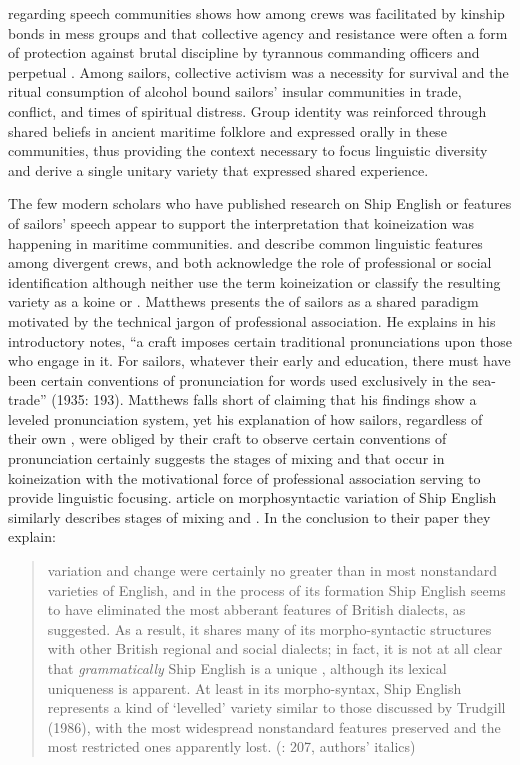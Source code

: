 regarding speech communities shows how  among crews was facilitated by kinship bonds in mess groups and that collective agency and resistance were often a form of protection against brutal discipline by tyrannous commanding officers and perpetual . Among sailors, collective activism was a necessity for survival and the ritual consumption of alcohol bound sailors’ insular communities in trade, conflict, and times of spiritual distress. Group identity was reinforced through shared beliefs in ancient maritime folklore and expressed orally in these communities, thus providing the context necessary to focus linguistic diversity and derive a single unitary variety that expressed shared experience. 


The few modern scholars who have published research on Ship English or features of sailors’ speech appear to support the interpretation that koineization was happening in maritime communities. \citet{Matthews1935} and \citet{BaileyRoss1988} describe common linguistic features among divergent crews, and both acknowledge the role of professional or social identification although neither use the term koineization or classify the resulting variety as a koine or . Matthews presents the  of sailors as a shared paradigm motivated by the technical jargon of professional association. He explains in his introductory notes, “a craft imposes certain traditional pronunciations upon those who engage in it. For sailors, whatever their early  and education, there must have been certain conventions of pronunciation for words used exclusively in the sea-trade” (1935: 193). Matthews falls short of claiming that his findings show a leveled pronunciation system, yet his explanation of how sailors, regardless of their own , were obliged by their craft to observe certain conventions of pronunciation certainly suggests the stages of mixing and  that occur in koineization with the motivational force of professional association serving to provide linguistic focusing.  article on morphosyntactic variation of Ship English similarly describes stages of mixing and . In the conclusion to their paper they explain: 


\begin{quotation}
variation and change were certainly no greater than in most nonstandard varieties of English, and in the process of its formation Ship English seems to have eliminated the most abberant features of British dialects, as \citet{Hancock1976} suggested. As a result, it shares many of its morpho-syntactic structures with other British regional and social dialects; in fact, it is not at all clear that \textit{grammatically} Ship English is a unique , although its lexical uniqueness is apparent. At least in its morpho-syntax, Ship English represents a kind of ‘levelled’ variety similar to those discussed by Trudgill (1986), with the most widespread nonstandard features preserved and the most restricted ones apparently lost. (\citealt{BaileyRoss1988}: 207, authors’ italics)
\end{quotation}

